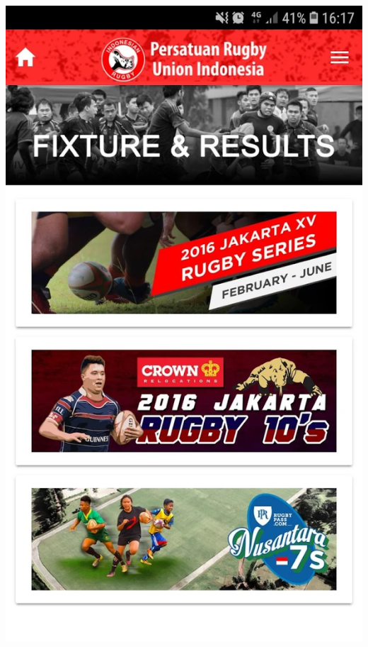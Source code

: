 \documentclass[a4paper,twoside]{article}
\begin{document}
\includegraphics[scale=0.125]{fixture_results.png} \hspace{0.5cm}
\end{document}
